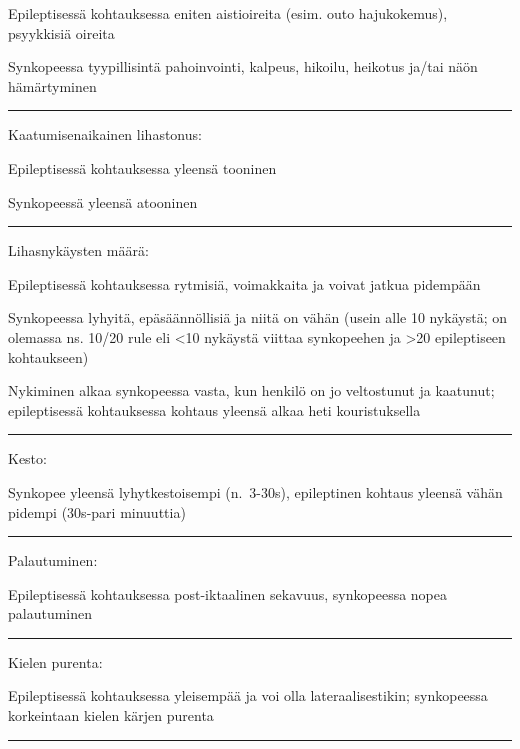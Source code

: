 \documentclass[
]{book}
\begin{document}
Epileptisessä kohtauksessa eniten aistioireita (esim. outo hajukokemus), psyykkisiä oireita

Synkopeessa tyypillisintä pahoinvointi, kalpeus, hikoilu, heikotus ja/tai näön hämärtyminen

\begin{center}\rule{0.5\linewidth}{0.5pt}\end{center}

Kaatumisenaikainen lihastonus:

Epileptisessä kohtauksessa yleensä tooninen

Synkopeessä yleensä atooninen

\begin{center}\rule{0.5\linewidth}{0.5pt}\end{center}

Lihasnykäysten määrä:

Epileptisessä kohtauksessa rytmisiä, voimakkaita ja voivat jatkua pidempään

Synkopeessa lyhyitä, epäsäännöllisiä ja niitä on vähän (usein alle 10 nykäystä; on olemassa ns. 10/20 rule eli \textless10 nykäystä viittaa synkopeehen ja \textgreater20 epileptiseen kohtaukseen)

Nykiminen alkaa synkopeessa vasta, kun henkilö on jo veltostunut ja kaatunut; epileptisessä kohtauksessa kohtaus yleensä alkaa heti kouristuksella

\begin{center}\rule{0.5\linewidth}{0.5pt}\end{center}

Kesto:

Synkopee yleensä lyhytkestoisempi (n.~3-30s), epileptinen kohtaus yleensä vähän pidempi (30s-pari minuuttia)

\begin{center}\rule{0.5\linewidth}{0.5pt}\end{center}

Palautuminen:

Epileptisessä kohtauksessa post-iktaalinen sekavuus, synkopeessa nopea palautuminen

\begin{center}\rule{0.5\linewidth}{0.5pt}\end{center}

Kielen purenta:

Epileptisessä kohtauksessa yleisempää ja voi olla lateraalisestikin; synkopeessa korkeintaan kielen kärjen purenta

\begin{center}\rule{0.5\linewidth}{0.5pt}\end{center}
\end{document}
